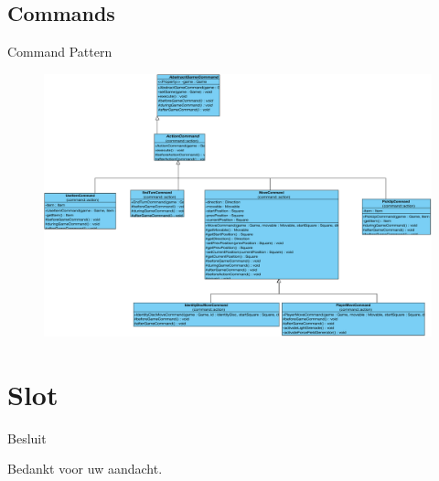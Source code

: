 \documentclass[t]{beamer}
\begin{document}
\subsection{Commands}
\begin{frame}{Command Pattern}
\begin{figure}
	\center
	\includegraphics[width= 0.8\linewidth]{img/Command_pattern.pdf}
\end{figure}	
\end{frame}


\section{Slot}
\begin{frame}{Besluit}
\vspace{0.8in}
\begin{center}
Bedankt voor uw aandacht.
\end{center}
\end{frame}
\end{document}

